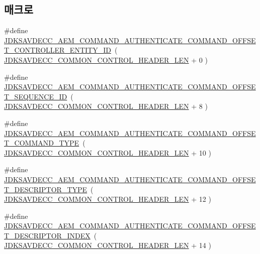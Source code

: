 \subsection*{매크로}
\begin{DoxyCompactItemize}
\item 
\#define \hyperlink{group__command__authenticate_ga06c32b7f579c4812af73b347002f3de2}{J\+D\+K\+S\+A\+V\+D\+E\+C\+C\+\_\+\+A\+E\+M\+\_\+\+C\+O\+M\+M\+A\+N\+D\+\_\+\+A\+U\+T\+H\+E\+N\+T\+I\+C\+A\+T\+E\+\_\+\+C\+O\+M\+M\+A\+N\+D\+\_\+\+O\+F\+F\+S\+E\+T\+\_\+\+C\+O\+N\+T\+R\+O\+L\+L\+E\+R\+\_\+\+E\+N\+T\+I\+T\+Y\+\_\+\+ID}~( \hyperlink{group__jdksavdecc__avtp__common__control__header_gaae84052886fb1bb42f3bc5f85b741dff}{J\+D\+K\+S\+A\+V\+D\+E\+C\+C\+\_\+\+C\+O\+M\+M\+O\+N\+\_\+\+C\+O\+N\+T\+R\+O\+L\+\_\+\+H\+E\+A\+D\+E\+R\+\_\+\+L\+EN} + 0 )
\item 
\#define \hyperlink{group__command__authenticate_ga621c1548f304b92f84a269dee92e676d}{J\+D\+K\+S\+A\+V\+D\+E\+C\+C\+\_\+\+A\+E\+M\+\_\+\+C\+O\+M\+M\+A\+N\+D\+\_\+\+A\+U\+T\+H\+E\+N\+T\+I\+C\+A\+T\+E\+\_\+\+C\+O\+M\+M\+A\+N\+D\+\_\+\+O\+F\+F\+S\+E\+T\+\_\+\+S\+E\+Q\+U\+E\+N\+C\+E\+\_\+\+ID}~( \hyperlink{group__jdksavdecc__avtp__common__control__header_gaae84052886fb1bb42f3bc5f85b741dff}{J\+D\+K\+S\+A\+V\+D\+E\+C\+C\+\_\+\+C\+O\+M\+M\+O\+N\+\_\+\+C\+O\+N\+T\+R\+O\+L\+\_\+\+H\+E\+A\+D\+E\+R\+\_\+\+L\+EN} + 8 )
\item 
\#define \hyperlink{group__command__authenticate_ga9df7679d7bc0a677e289393932b82531}{J\+D\+K\+S\+A\+V\+D\+E\+C\+C\+\_\+\+A\+E\+M\+\_\+\+C\+O\+M\+M\+A\+N\+D\+\_\+\+A\+U\+T\+H\+E\+N\+T\+I\+C\+A\+T\+E\+\_\+\+C\+O\+M\+M\+A\+N\+D\+\_\+\+O\+F\+F\+S\+E\+T\+\_\+\+C\+O\+M\+M\+A\+N\+D\+\_\+\+T\+Y\+PE}~( \hyperlink{group__jdksavdecc__avtp__common__control__header_gaae84052886fb1bb42f3bc5f85b741dff}{J\+D\+K\+S\+A\+V\+D\+E\+C\+C\+\_\+\+C\+O\+M\+M\+O\+N\+\_\+\+C\+O\+N\+T\+R\+O\+L\+\_\+\+H\+E\+A\+D\+E\+R\+\_\+\+L\+EN} + 10 )
\item 
\#define \hyperlink{group__command__authenticate_gae59b6008707cccaab8f575f3e83dcea4}{J\+D\+K\+S\+A\+V\+D\+E\+C\+C\+\_\+\+A\+E\+M\+\_\+\+C\+O\+M\+M\+A\+N\+D\+\_\+\+A\+U\+T\+H\+E\+N\+T\+I\+C\+A\+T\+E\+\_\+\+C\+O\+M\+M\+A\+N\+D\+\_\+\+O\+F\+F\+S\+E\+T\+\_\+\+D\+E\+S\+C\+R\+I\+P\+T\+O\+R\+\_\+\+T\+Y\+PE}~( \hyperlink{group__jdksavdecc__avtp__common__control__header_gaae84052886fb1bb42f3bc5f85b741dff}{J\+D\+K\+S\+A\+V\+D\+E\+C\+C\+\_\+\+C\+O\+M\+M\+O\+N\+\_\+\+C\+O\+N\+T\+R\+O\+L\+\_\+\+H\+E\+A\+D\+E\+R\+\_\+\+L\+EN} + 12 )
\item 
\#define \hyperlink{group__command__authenticate_gafaa8d369e9f1badb16456baedc015ae1}{J\+D\+K\+S\+A\+V\+D\+E\+C\+C\+\_\+\+A\+E\+M\+\_\+\+C\+O\+M\+M\+A\+N\+D\+\_\+\+A\+U\+T\+H\+E\+N\+T\+I\+C\+A\+T\+E\+\_\+\+C\+O\+M\+M\+A\+N\+D\+\_\+\+O\+F\+F\+S\+E\+T\+\_\+\+D\+E\+S\+C\+R\+I\+P\+T\+O\+R\+\_\+\+I\+N\+D\+EX}~( \hyperlink{group__jdksavdecc__avtp__common__control__header_gaae84052886fb1bb42f3bc5f85b741dff}{J\+D\+K\+S\+A\+V\+D\+E\+C\+C\+\_\+\+C\+O\+M\+M\+O\+N\+\_\+\+C\+O\+N\+T\+R\+O\+L\+\_\+\+H\+E\+A\+D\+E\+R\+\_\+\+L\+EN} + 14 )

\end{DoxyCompactItemize}
